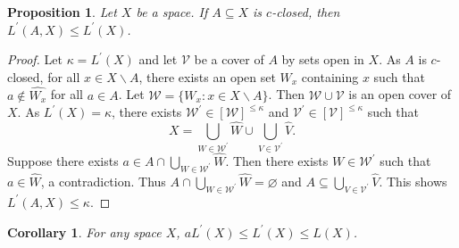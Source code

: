 \documentclass[11pt]{amsart}
\newif\ifdraft\draftfalse
\newtheorem{corollary}[theorem]{Corollary}
\newtheorem{proposition}[theorem]{Proposition}
\theoremstyle{definition}
\theoremstyle{remark}
\numberwithin{equation}{section}
\begin{document}
\begin{proposition}{{\immediate{}}{\ifdraft\hspace{-\lastskip}\vadjust{\vspace{-1mm}\smash{\llap{{\tt {{Lhered}}}\hspace{8mm}}}\vspace{1mm}}\fi}}
Let $X$ be a space. If $A{\subseteq} X$ is $c$-closed, then $L^\prime(A,X)\leq L^\prime(X)$.
\end{proposition}

\begin{proof}
Let $\kappa=L^\prime(X)$ and let ${\ensuremath{\mathcal{{V}}}}$ be a cover of $A$ by sets open in $X$. As $A$ is $c$-closed, for all $x\in X{\backslash} A$, there exists an open set $W_x$ containing $x$ such that $a\notin\widehat{W_x}$ for all $a\in A$. Let ${\ensuremath{\mathcal{{W}}}}=\{W_x:x\in X{\backslash} A\}$. Then ${\ensuremath{\mathcal{{W}}}}{\cup}{\ensuremath{\mathcal{{V}}}}$ is an open cover of $X$. As $L^\prime(X)=\kappa$, there exists ${\ensuremath{\mathcal{{W}}}}^\prime\in[{\ensuremath{\mathcal{{W}}}}]^{\leq\kappa}$ and ${\ensuremath{\mathcal{{V}}}}^\prime\in[{\ensuremath{\mathcal{{V}}}}]^{\leq\kappa}$ such that
$$X={\bigcup}_{W\in{\ensuremath{\mathcal{{W}}}}^\prime}\widehat{W}{\cup}{\bigcup}_{V\in{\ensuremath{\mathcal{{V}}}}^\prime}\widehat{V}.$$
Suppose there exists $a\in A{\cap}{\bigcup}_{W\in{\ensuremath{\mathcal{{W}}}}^\prime}\widehat{W}$. Then there exists $W\in{\ensuremath{\mathcal{{W}}}}^\prime$ such that $a\in\widehat{W}$, a contradiction.  Thus $A{\cap}{\bigcup}_{W\in{\ensuremath{\mathcal{{W}}}}^\prime}\widehat{W}={\varnothing}$ and $A{\subseteq}{\bigcup}_{V\in{\ensuremath{\mathcal{{V}}}}^\prime}\widehat{V}$. This shows $L^\prime(A,X)\leq\kappa$.
\end{proof}

\begin{corollary}{{\immediate{}}{\ifdraft\hspace{-\lastskip}\vadjust{\vspace{-1mm}\smash{\llap{{\tt {{aLL}}}\hspace{8mm}}}\vspace{1mm}}\fi}}
For any space $X$, $aL^\prime(X)\leq L^\prime(X)\leq L(X)$.
\end{corollary}
\end{document}
